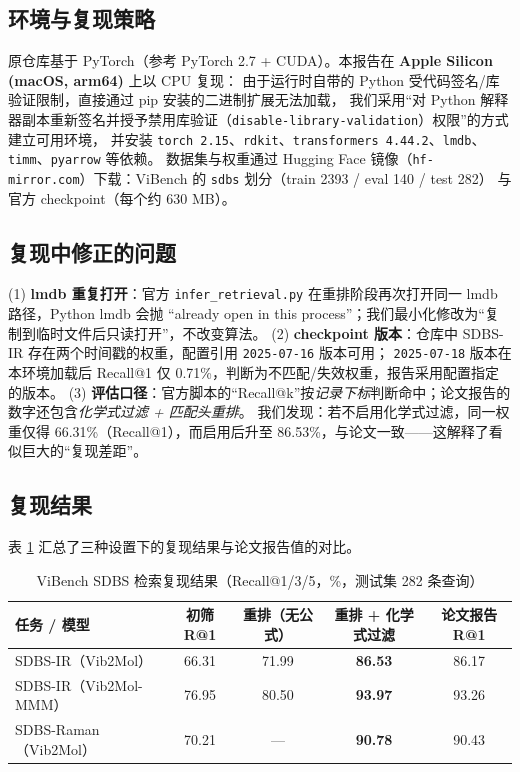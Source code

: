 \documentclass[UTF8,a4paper,11pt]{ctexart}
\begin{document}
\subsection{环境与复现策略}
原仓库基于 PyTorch（参考 PyTorch 2.7 + CUDA）。本报告在 \textbf{Apple Silicon (macOS, arm64)} 上以 CPU 复现：
由于运行时自带的 Python 受代码签名/库验证限制，直接通过 pip 安装的二进制扩展无法加载，
我们采用“对 Python 解释器副本重新签名并授予禁用库验证（\texttt{disable-library-}\allowbreak\texttt{validation}）权限”的方式建立可用环境，
并安装 \texttt{torch 2.15}、\texttt{rdkit}、\texttt{transformers 4.44.2}、\texttt{lmdb}、\texttt{timm}、\texttt{pyarrow} 等依赖。
数据集与权重通过 Hugging Face 镜像（\texttt{hf-mirror.com}）下载：ViBench 的 \texttt{sdbs} 划分（train 2393 / eval 140 / test 282）
与官方 checkpoint（每个约 630 MB）。

\subsection{复现中修正的问题}
(1) \textbf{lmdb 重复打开}：官方 \texttt{infer\_retrieval.py} 在重排阶段再次打开同一 lmdb 路径，Python lmdb 会抛
“already open in this process”；我们最小化修改为“复制到临时文件后只读打开”，不改变算法。
(2) \textbf{checkpoint 版本}：仓库中 SDBS-IR 存在两个时间戳的权重，配置引用 \texttt{2025-07-16} 版本可用；
\texttt{2025-07-18} 版本在本环境加载后 Recall@1 仅 0.71\%，判断为不匹配/失效权重，报告采用配置指定的版本。
(3) \textbf{评估口径}：官方脚本的“Recall@k”按\emph{记录下标}判断命中；论文报告的数字还包含\emph{化学式过滤 + 匹配头重排}。
我们发现：若不启用化学式过滤，同一权重仅得 66.31\%（Recall@1），而启用后升至 86.53\%，与论文一致——这解释了看似巨大的“复现差距”。

\subsection{复现结果}
表 \ref{tab:repro} 汇总了三种设置下的复现结果与论文报告值的对比。

\begin{table}[H]
\centering\small
\caption{ViBench SDBS 检索复现结果（Recall@1/3/5，\%，测试集 282 条查询）}
\label{tab:repro}
\begin{tabular}{@{}lcccc@{}}
\toprule
任务 / 模型 & 初筛 R@1 & 重排（无公式） & 重排 + 化学式过滤 & 论文报告 R@1\\
\midrule
SDBS-IR（Vib2Mol） & 66.31 & 71.99 & \textbf{86.53} & 86.17\\
SDBS-IR（Vib2Mol-MMM） & 76.95 & 80.50 & \textbf{93.97} & 93.26\\
SDBS-Raman（Vib2Mol） & 70.21 & --- & \textbf{90.78} & 90.43\\
\bottomrule
\end{tabular}
\end{table}
\end{document}

